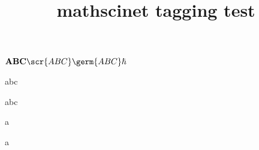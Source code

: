 \documentclass{article}
\title{mathscinet tagging test}
\begin{document}
$
\bold{ABC}
\scr{ABC}
\germ{ABC}
\hslash
$

abc

abc

a\rasp

a\lasp

\Dbar

\dbar

\cprime

\cdprime

\bud

\cydot






\ifdefined\Uchar
\else
{}

\fi
\end{document}
